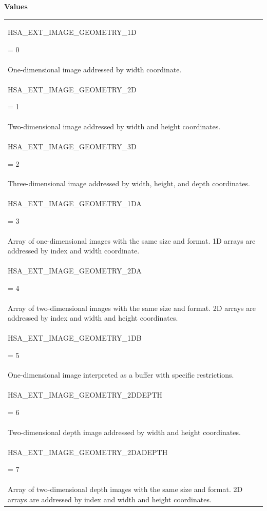\documentclass[final]{book}
\newcommand{\reftyp}[1]{#1}
\newcommand{\refenu}[1]{\reftyp{#1}}
\begin{document}
\noindent\textbf{Values}\\[-5mm]
\begin{longtable}{@{\hspace{2em}}p{\linewidth-2em}}
\hspace{-2em}\hypertarget{group__images_1ggac61587d98a80d1660378e3904a66fc9caa025ea993dbfe3101d3ff0caea2ea0cf}{\refenu{HSA_EXT_IMAGE_GEOMETRY_1D}} = 0\\One-dimensional image addressed by width coordinate.\\[2mm]
\hspace{-2em}\hypertarget{group__images_1ggac61587d98a80d1660378e3904a66fc9ca4bcc28ccad5a32bd9c9dbf203da4464e}{\refenu{HSA_EXT_IMAGE_GEOMETRY_2D}} = 1\\Two-dimensional image addressed by width and height coordinates.\\[2mm]
\hspace{-2em}\hypertarget{group__images_1ggac61587d98a80d1660378e3904a66fc9ca2e749b6b96377b9a744fc837296e318c}{\refenu{HSA_EXT_IMAGE_GEOMETRY_3D}} = 2\\Three-dimensional image addressed by width, height, and depth coordinates.\\[2mm]
\hspace{-2em}\hypertarget{group__images_1ggac61587d98a80d1660378e3904a66fc9cad989c8e619b376dc98ac3950be9afa33}{\refenu{HSA_EXT_IMAGE_GEOMETRY_1DA}} = 3\\Array of one-dimensional images with the same size and format. 1D arrays are addressed by index and width coordinate.\\[2mm]
\hspace{-2em}\hypertarget{group__images_1ggac61587d98a80d1660378e3904a66fc9ca90929e69cbf0b447060e1aeb23fd6dd4}{\refenu{HSA_EXT_IMAGE_GEOMETRY_2DA}} = 4\\Array of two-dimensional images with the same size and format. 2D arrays are addressed by index and width and height coordinates.\\[2mm]
\hspace{-2em}\hypertarget{group__images_1ggac61587d98a80d1660378e3904a66fc9ca47b208990ed715c37071f1fff17e812c}{\refenu{HSA_EXT_IMAGE_GEOMETRY_1DB}} = 5\\One-dimensional image interpreted as a buffer with specific restrictions.\\[2mm]
\hspace{-2em}\hypertarget{group__images_1ggac61587d98a80d1660378e3904a66fc9caf1f195107c114c7235275f047d2f0474}{\refenu{HSA_EXT_IMAGE_GEOMETRY_2DDEPTH}} = 6\\Two-dimensional depth image addressed by width and height coordinates.\\[2mm]
\hspace{-2em}\hypertarget{group__images_1ggac61587d98a80d1660378e3904a66fc9caf3d5440659a9dfd7892da13c1fe992bd}{\refenu{HSA_EXT_IMAGE_GEOMETRY_2DADEPTH}} = 7\\Array of two-dimensional depth images with the same size and format. 2D arrays are addressed by index and width and height coordinates.
\end{longtable}
\end{document}
